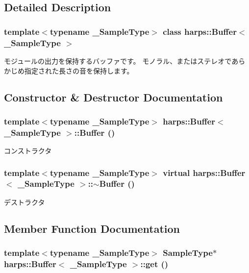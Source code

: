 \subsection{Detailed Description}
\subsubsection*{template$<$typename \_\-SampleType$>$ class harps::Buffer$<$ \_\-SampleType $>$}

モジュールの出力を保持するバッファです。 モノラル、またはステレオであらかじめ指定された長さの音を保持します。 

\subsection{Constructor \& Destructor Documentation}
\subsubsection[Buffer]{\setlength{\rightskip}{0pt plus 5cm}template$<$typename \_\-SampleType$>$ {\bf harps::Buffer}$<$ \_\-SampleType $>$::{\bf Buffer} ()\hspace{0.3cm}{\tt  [inline]}}\label{classharps_1_1Buffer_efec369ca2232f71a3846085fee8eb93}


コンストラクタ 
\subsubsection[$\sim$Buffer]{\setlength{\rightskip}{0pt plus 5cm}template$<$typename \_\-SampleType$>$ virtual {\bf harps::Buffer}$<$ \_\-SampleType $>$::$\sim${\bf Buffer} ()\hspace{0.3cm}{\tt  [inline, virtual]}}\label{classharps_1_1Buffer_31d11f5c708d11688b49bee7e9af84fd}


デストラクタ 

\subsection{Member Function Documentation}
\subsubsection[get]{\setlength{\rightskip}{0pt plus 5cm}template$<$typename \_\-SampleType$>$ SampleType$\ast$ {\bf harps::Buffer}$<$ \_\-SampleType $>$::get ()\hspace{0.3cm}{\tt  [inline]}}\label{classharps_1_1Buffer_2a7f5913399484eec854689812ea0bb9}


